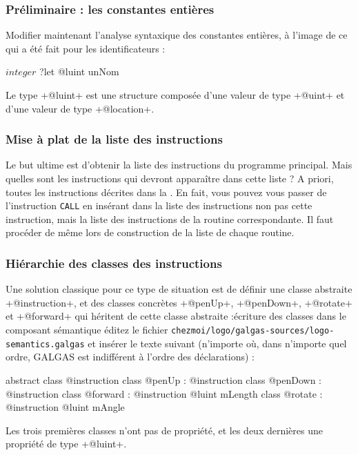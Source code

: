 \subsubsection{Préliminaire : les constantes entières}

Modifier maintenant l’analyse syntaxique des constantes entières, à l’image de ce qui a été fait pour les identificateurs :
\begin{galgas}
$integer$ ?let @luint unNom
\end{galgas}

Le type \ggs+@luint+ est une structure composée d’une valeur de type \ggs+@uint+ et d’une valeur de type \ggs+@location+.

\subsubsection{Mise à plat de la liste des instructions}
Le but ultime est d'obtenir la liste des instructions du programme principal. Mais quelles sont les instructions qui devront apparaître dans cette liste ? A priori, toutes les instructions décrites dans la . En fait, vous pouvez vous passer de l'instruction \texttt{CALL} en insérant dans la liste des instructions non pas cette instruction, mais la liste des instructions de la routine correspondante. Il faut procéder de même lors de construction de la liste de chaque routine.

\subsubsection{Hiérarchie des classes des instructions}
Une solution classique pour ce type de situation est de définir une classe abstraite \ggs+@instruction+, et des classes concrètes \ggs+@penUp+, \ggs+@penDown+, \ggs+@rotate+ et \ggs+@forward+ qui héritent de cette classe abstraite :écriture des classes dans le composant sémantique éditez le fichier \texttt{chezmoi/logo/galgas-sources/logo-semantics.galgas} et insérer le texte suivant (n’importe où, dans n’importe quel ordre, GALGAS est indifférent à l’ordre des déclarations) :

\begin{galgas}
abstract class @instruction {
}
class @penUp : @instruction {
}
class @penDown : @instruction {
}
class @forward : @instruction {
  @luint mLength
}
class @rotate : @instruction {
  @luint mAngle
}
\end{galgas}


Les trois premières classes n'ont pas de propriété, et les deux dernières une propriété de type \ggs+@luint+.

